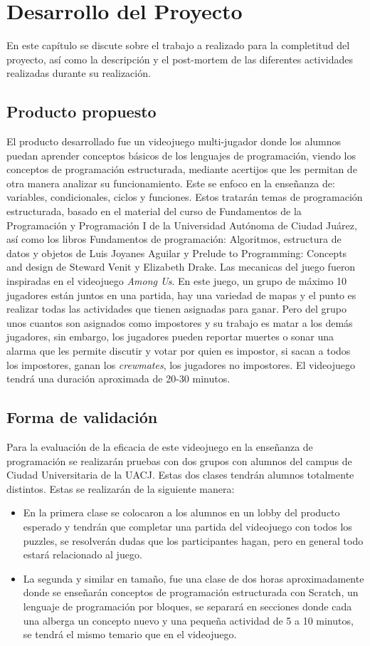 \chapter{Desarrollo del Proyecto}
En este capítulo se discute sobre el trabajo a realizado para la completitud del proyecto, así como la descripción y el post-mortem de las diferentes actividades realizadas durante su realización.

\section{Producto propuesto}
El producto desarrollado fue un videojuego multi-jugador donde los alumnos puedan aprender conceptos básicos de los lenguajes de programación, viendo los conceptos de programación estructurada, mediante acertijos que les permitan de otra manera analizar su funcionamiento. Este se enfoco en la enseñanza de: variables, condicionales, ciclos y funciones. Estos tratarán temas de programación estructurada, basado en el material del curso de Fundamentos de la Programación y Programación I de la Universidad Autónoma de Ciudad Juárez, así como los libros Fundamentos de programación: Algoritmos, estructura de datos y objetos de Luis Joyanes Aguilar y Prelude to Programming: Concepts and design de Steward Venit y Elizabeth Drake. 
Las mecanicas del juego fueron inspiradas en el videojuego \textit{Among Us}. En este juego, un grupo de máximo 10 jugadores están juntos en una partida, hay una variedad de mapas y el punto es realizar todas las actividades que tienen asignadas para ganar. Pero del grupo unos cuantos son asignados como impostores y su trabajo es matar a los demás jugadores, sin embargo, los jugadores pueden reportar muertes o sonar una alarma que les permite discutir y votar por quien es impostor, si sacan a todos los impostores, ganan los \textit{crewmates}, los jugadores no impostores.
El videojuego tendrá una duración aproximada de 20-30 minutos.

\section{Forma de validación}
Para la evaluación de la eficacia de este videojuego en la enseñanza de programación se realizarán pruebas con dos grupos con alumnos del campus de Ciudad Universitaria de la UACJ.
Estas dos clases tendrán alumnos totalmente distintos. Estas se realizarán de la siguiente manera:
\begin{itemize}
    \item En la primera clase se colocaron a los alumnos en un lobby del producto esperado y tendrán que completar una partida del videojuego con todos los puzzles, se resolverán dudas que los participantes hagan, pero en general todo estará relacionado al juego.
    \item La segunda y similar en tamaño, fue una clase de dos horas aproximadamente donde se enseñarán conceptos de programación estructurada con Scratch, un lenguaje de programación por bloques, se separará en secciones donde cada una alberga un concepto nuevo y una pequeña actividad de 5 a 10 minutos, se tendrá el mismo temario que en el videojuego.
\end{itemize}

